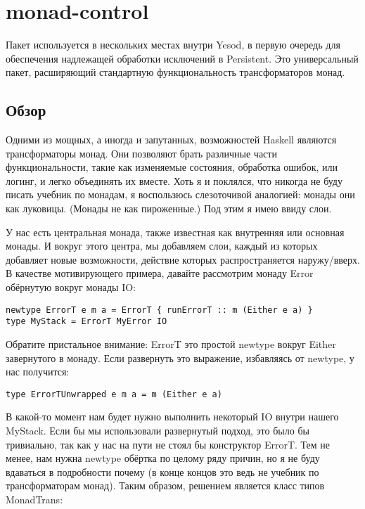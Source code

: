 \chapter{monad-control}\label{chap:monad-control}
Пакет  используется в нескольких местах внутри Yesod, в первую очередь для обеспечения надлежащей обработки исключений в Persistent. Это универсальный пакет, расширяющий стандартную функциональность трансформаторов монад.

\section{Обзор}

Одними из мощных, а иногда и запутанных, возможностей Haskell являются трансформаторы монад. Они позволяют брать различные части функциональности, такие как изменяемые состояния, обработка ошибок, или логинг, и легко объединять их вместе. Хоть я и поклялся, что никогда не буду писать учебник по монадам, я воспользюсь слезоточивой аналогией: монады они как луковицы. (Монады не как пироженные.) Под этим я имею ввиду слои.

У нас есть центральная монада, также известная как внутренняя или основная монады. И вокруг этого центра, мы добавляем слои, каждый из которых добавляет новые возможности, действие которых распространяется наружу/вверх. В качестве мотивирующего примера, давайте рассмотрим монаду Error обёрнутую вокруг монады IO:

\begin{lstlisting}
newtype ErrorT e m a = ErrorT { runErrorT :: m (Either e a) }
type MyStack = ErrorT MyError IO
\end{lstlisting}

Обратите пристальное внимание: ErrorT это простой newtype вокруг Either завернутого в монаду. Если развернуть это выражение, избавляясь от newtype, у нас получится:

\begin{lstlisting}
type ErrorTUnwrapped e m a = m (Either e a)
\end{lstlisting}

В какой-то момент нам будет нужно выполнить некоторый IO внутри нашего MyStack. Если бы мы использовали развернутый подход, это было бы тривиально, так как у нас на пути не стоял бы конструктор ErrorT. Тем не менее, нам нужна newtype обёртка по целому ряду причин, но я не буду вдаваться в подробности почему (в конце концов это ведь не учебник по трансформаторам монад). Таким образом, решением является класс типов MonadTrans:

